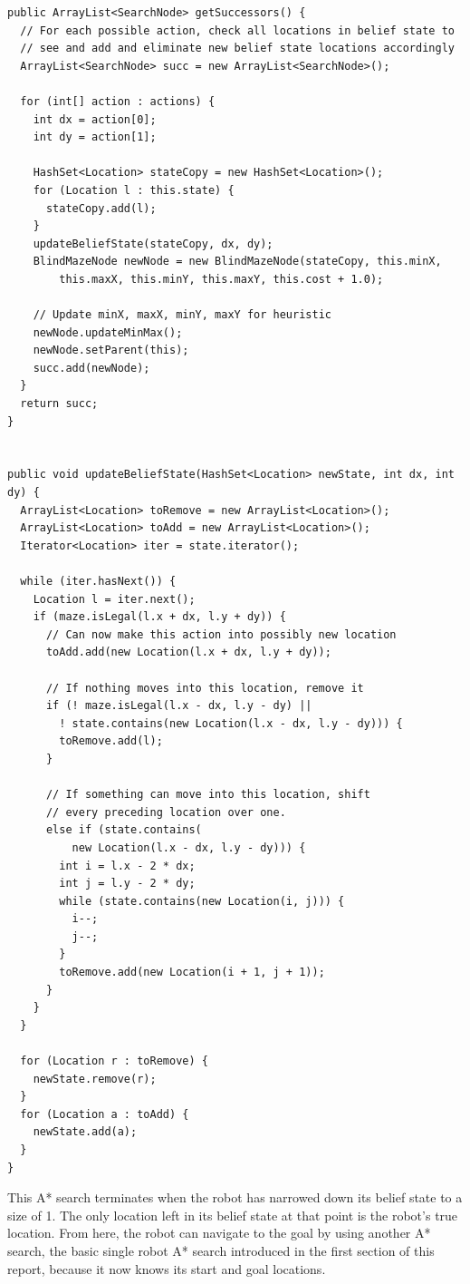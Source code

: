 \documentclass{article}
\begin{document}
\begin{lstlisting}
public ArrayList<SearchNode> getSuccessors() {
  // For each possible action, check all locations in belief state to
  // see and add and eliminate new belief state locations accordingly
  ArrayList<SearchNode> succ = new ArrayList<SearchNode>();
  
  for (int[] action : actions) {
    int dx = action[0];
    int dy = action[1];
    
    HashSet<Location> stateCopy = new HashSet<Location>();
    for (Location l : this.state) {
      stateCopy.add(l);
    }
    updateBeliefState(stateCopy, dx, dy);
    BlindMazeNode newNode = new BlindMazeNode(stateCopy, this.minX,
        this.maxX, this.minY, this.maxY, this.cost + 1.0);
    
    // Update minX, maxX, minY, maxY for heuristic
    newNode.updateMinMax();
    newNode.setParent(this);
    succ.add(newNode);
  }
  return succ;
}


public void updateBeliefState(HashSet<Location> newState, int dx, int dy) {
  ArrayList<Location> toRemove = new ArrayList<Location>();
  ArrayList<Location> toAdd = new ArrayList<Location>();
  Iterator<Location> iter = state.iterator();
  
  while (iter.hasNext()) {
    Location l = iter.next();
    if (maze.isLegal(l.x + dx, l.y + dy)) {
      // Can now make this action into possibly new location
      toAdd.add(new Location(l.x + dx, l.y + dy));
      
      // If nothing moves into this location, remove it
      if (! maze.isLegal(l.x - dx, l.y - dy) || 
        ! state.contains(new Location(l.x - dx, l.y - dy))) {
        toRemove.add(l);
      }
      
      // If something can move into this location, shift
      // every preceding location over one.
      else if (state.contains(
          new Location(l.x - dx, l.y - dy))) {
        int i = l.x - 2 * dx;
        int j = l.y - 2 * dy;
        while (state.contains(new Location(i, j))) {
          i--;
          j--;
        }
        toRemove.add(new Location(i + 1, j + 1));
      }
    }
  }

  for (Location r : toRemove) {
    newState.remove(r);
  }
  for (Location a : toAdd) {
    newState.add(a);
  }
}
\end{lstlisting}

This A* search terminates when the robot has narrowed down its belief state to a size of 1. The only location left in its belief state at that point is the robot's true location. From here, the robot can navigate to the goal by using another A* search, the basic single robot A* search introduced in the first section of this report, because it now knows its start and goal locations.
\end{document}
